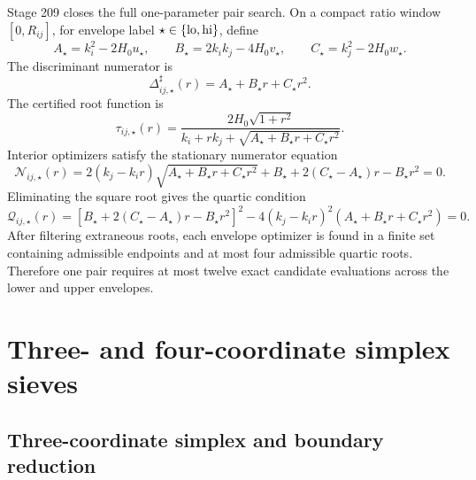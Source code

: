 Stage 209 closes the full one-parameter pair search.  On a compact ratio window \([0,R_{ij}]\), for envelope label \(\star\in\{\rm lo,hi\}\), define
\begin{equation}
\label{eq:app-part06-pairwise-ABC}
A_\star=k_i^2-2H_0u_\star,
\qquad
B_\star=2k_ik_j-4H_0v_\star,
\qquad
C_\star=k_j^2-2H_0w_\star.
\end{equation}
The discriminant numerator is
\begin{equation}
\label{eq:app-part06-pairwise-discriminant-numerator}
\Delta_{ij,\star}^{\sharp}(r)=A_\star+B_\star r+C_\star r^2.
\end{equation}
The certified root function is
\begin{equation}
\label{eq:app-part06-pairwise-root-function}
\tau_{ij,\star}(r)=
\frac{2H_0\sqrt{1+r^2}}
{k_i+rk_j+\sqrt{A_\star+B_\star r+C_\star r^2}}.
\end{equation}
Interior optimizers satisfy the stationary numerator equation
\begin{equation}
\label{eq:app-part06-pairwise-stationary-numerator}
\mathcal N_{ij,\star}(r)=
2(k_j-k_ir)\sqrt{A_\star+B_\star r+C_\star r^2}
+B_\star+2(C_\star-A_\star)r-B_\star r^2=0.
\end{equation}
Eliminating the square root gives the quartic condition
\begin{equation}
\label{eq:app-part06-pairwise-quartic}
\mathcal Q_{ij,\star}(r)=
\left[B_\star+2(C_\star-A_\star)r-B_\star r^2\right]^2
-4(k_j-k_ir)^2(A_\star+B_\star r+C_\star r^2)=0.
\end{equation}
After filtering extraneous roots, each envelope optimizer is found in a finite set containing admissible endpoints and at most four admissible quartic roots.  Therefore one pair requires at most twelve exact candidate evaluations across the lower and upper envelopes.


\section{Three- and four-coordinate simplex sieves}
\label{sec:app-part06-three-four-coordinate-simplex-sieves}

\subsection{Three-coordinate simplex and boundary reduction}
\label{subsec:app-part06-three-simplex-boundary-reduction}

